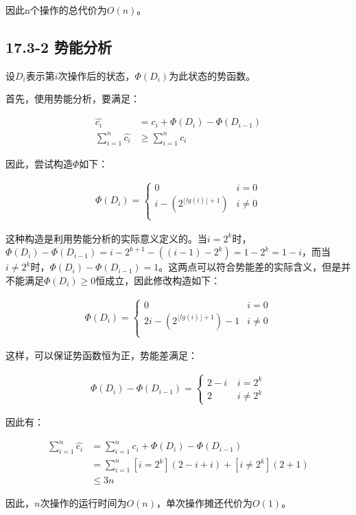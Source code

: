 \documentclass{article}
\begin{document}
因此n个操作的总代价为\(O(n)\)。

\hypertarget{header-n11}{%
\subsection{17.3-2 势能分析}\label{header-n11}}

设\(D_i\)表示第\(i\)次操作后的状态，\(\Phi(D_i)\)为此状态的势函数。

首先，使用势能分析，要满足：

\[\begin{aligned}
	\hat{c_i} &= c_i + \Phi(D_i) - \Phi(D_{i-1}) \\
	\sum_{i=1}^{n} \hat{c_i} &\ge \sum_{i=1}^{n} c_i
\end{aligned}\]

因此，尝试构造\(\Phi\)如下：

\[\begin{aligned}
	\Phi(D_i) = \begin{cases} 
		0 \; & i=0 \\
		i - (2^{\lfloor lg(i) \rfloor  + 1}) & i \neq 0 \\
	\end{cases}
\end{aligned}\]

这种构造是利用势能分析的实际意义定义的。当\(i=2^k\)时，\(\Phi(D_i)-\Phi(D_{i-1}) = i - 2^{k+1} - ((i-1) - 2^{k}) = 1-2^k = 1 - i\)，而当\(i \neq 2^k\)时，\(\Phi(D_i) - \Phi(D_{i-1}) = 1\)。这两点可以符合势能差的实际含义，但是并不能满足\(\Phi(D_i) \ge 0\)恒成立，因此修改构造如下：

\[\begin{aligned}
	\Phi(D_i) = \begin{cases} 
		0 \; & i=0 \\
		2i - (2^{\lfloor lg(i) \rfloor  + 1}) - 1 & i \neq 0 \\
	\end{cases}
\end{aligned}\]

这样，可以保证势函数恒为正，势能差满足：

\[\begin{aligned}
	\Phi(D_i) - \Phi(D_{i-1}) = \begin{cases}
		2 - i \; & i = 2^k \\
		2 \; & i \ne 2^k
	\end{cases}
\end{aligned}\]

因此有：

\[\begin{aligned}
	\sum_{i=1}^{n} \hat{c_i} &= \sum_{i=1}^{n}c_i + \Phi(D_i)  - \Phi(D_{i-1})\\
    &= \sum_{i=1} ^{n} [i=2^k](2-i + i) + [i \ne 2^k](2+1) \\
	& \leq 3n
\end{aligned}\]

因此，\(n\)次操作的运行时间为\(O(n)\)，单次操作摊还代价为\(O(1)\)。
\end{document}
